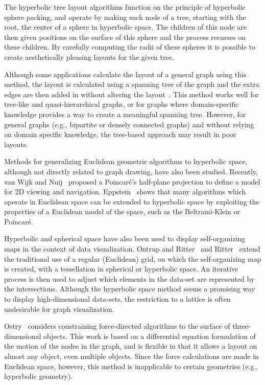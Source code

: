 \documentclass[notitlepage,letter,11pt]{article}
\begin{document}
The hyperbolic tree layout algorithms function on the principle of
hyperbolic sphere packing, and operate by making each node of a tree,
starting with the root, the center of a sphere in hyperbolic space.
The children of this node are then given positions on the surface of
this sphere and the process recurses on these children.  By carefully
computing the radii
of these spheres
it is possible to create aesthetically pleasing layouts for the
given tree. 

 Although some applications calculate the layout of a
general graph using this method, the layout is calculated using a
spanning tree of the graph and the extra edges are then added in
without altering the layout~\cite{munzner-gd98}. This method works
well for tree-like and quasi-hierarchical graphs, or for graphs
where domain-specific knowledge provides a way to create a
meaningful spanning tree. However, for general graphs (e.g.,
bipartite or densely connected graphs) and without relying on
domain specific knowledge, the tree-based approach may result in
poor layouts.

Methods for generalizing Euclidean geometric algorithms to hyperbolic
space, although not directly related to graph drawing, have also been
studied. Recently, van Wijk and Nuij~\cite{wn-msv-04} proposed a
Poincar\'{e}'s half-plane projection to define a model for 2D viewing
and navigation. Eppstein~\cite{eppstein-msri-03} shows that many
algorithms which operate in Euclidean space can be extended to
hyperbolic space by exploiting the properties of a Euclidean model of
the space, such as the Beltrami-Klein or Poincar\'{e}. 

Hyperbolic and spherical space have also been used to display
self-organizing maps in the context of data visualization. Ontrup and
Ritter~\cite{ontrup-hyperbolic} and
Ritter~\cite{ritter99selforganizing} extend the traditional use of a
regular (Euclidean) grid, on which the self-organizing map is created,
with a tessellation in spherical or hyperbolic space.  An iterative
process is then used to adjust which elements in the data-set are
represented by the intersections.  Although the hyperbolic space
method seems a promising way to display high-dimensional data-sets,
the restriction to a lattice is often undesirable for graph
visualization. 


Ostry~\cite{ostry96some} considers constraining force-directed
algorithms to the surface of three-dimensional objects. This work is
based on a differential equation formulation of the motion of the
nodes in the graph, and is flexible in that it allows a layout on
almost any object, even multiple objects.  Since the force
calculations are made in Euclidean space, however, this method is
inapplicable to certain geometries (e.g., hyperbolic geometry).
\end{document}
